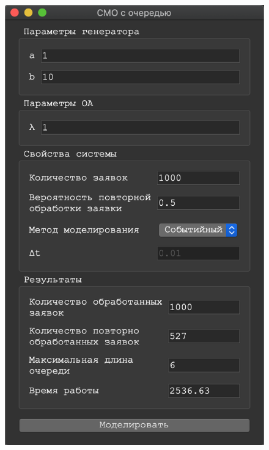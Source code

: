 \documentclass[a4paper,12pt]{article}
\begin{document}
	\begin{figure}[h!]
		\begin{minipage}[b]{0.32\textwidth}
			\includegraphics[width=\textwidth]{sob_3_1.png}
		\end{minipage}
		\begin{minipage}[b]{0.32\textwidth}

\end{minipage}
\end{figure}
\end{document}

